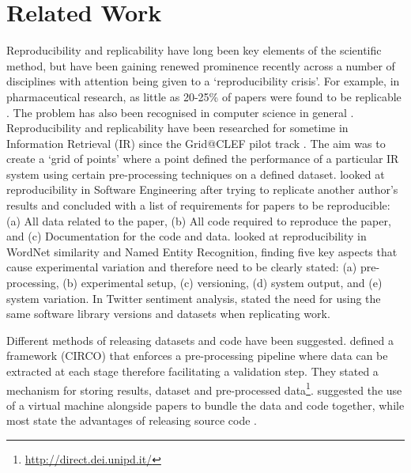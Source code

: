 \FloatBarrier
\section{Related Work}
Reproducibility and replicability have long been key elements of the scientific method, but have been gaining renewed prominence recently across a number of disciplines with attention being given to a `reproducibility crisis'. For example, in pharmaceutical research, as little as 20-25\% of papers were found to be replicable \citep{prinz2011believe}. The problem has also been recognised in computer science in general \citep{collberg2016repeatability}. Reproducibility and replicability have been researched for sometime in  Information Retrieval (IR) since the Grid@CLEF pilot track \citep{ferro2009clef}. The aim was to create a `grid of points' where a point defined the performance of a particular IR system using certain pre-processing techniques on a defined dataset.
\citet{louridas2012note} looked at reproducibility in Software Engineering after trying to replicate another author's results and concluded with a list of requirements for papers to be reproducible: (a) All data related to the paper, (b) All code required to reproduce the paper, and (c) Documentation for the code and data. \citet{fokkens-etal-2013-offspring} looked at reproducibility in WordNet similarity and Named Entity Recognition, finding five key aspects that cause experimental variation and therefore need to be clearly stated: (a) pre-processing, (b) experimental setup, (c) versioning, (d) system output, and (e) system variation. In Twitter sentiment analysis, \citet{sygkounas2016replication} stated the need for using the same software library versions and datasets when replicating work.

Different methods of releasing datasets and code have been suggested. \citet{ferro2009clef} defined a framework (CIRCO) that enforces a pre-processing pipeline where data can be extracted at each stage therefore facilitating a validation step. They stated a mechanism for storing results, dataset and pre-processed data\footnote{\url{http://direct.dei.unipd.it/}}. \citet{louridas2012note} suggested the use of a virtual machine alongside papers to bundle the data and code together, while most state the advantages of releasing source code \citep{fokkens-etal-2013-offspring, potthast2016wrote, sygkounas2016replication}. 


